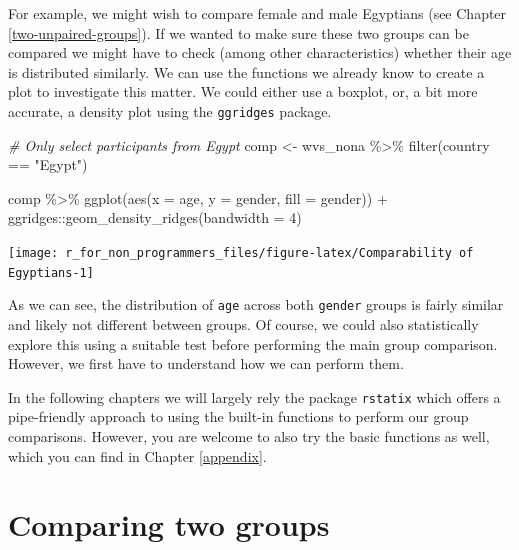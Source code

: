 \documentclass[
]{book}
\newenvironment{Shaded}{\begin{snugshade}}{\end{snugshade}}
\newcommand{\AttributeTok}[1]{\textcolor[rgb]{0.77,0.63,0.00}{#1}}
\newcommand{\CommentTok}[1]{\textcolor[rgb]{0.56,0.35,0.01}{\textit{#1}}}
\newcommand{\DecValTok}[1]{\textcolor[rgb]{0.00,0.00,0.81}{#1}}
\newcommand{\FunctionTok}[1]{\textcolor[rgb]{0.00,0.00,0.00}{#1}}
\newcommand{\NormalTok}[1]{#1}
\newcommand{\OtherTok}[1]{\textcolor[rgb]{0.56,0.35,0.01}{#1}}
\newcommand{\SpecialCharTok}[1]{\textcolor[rgb]{0.00,0.00,0.00}{#1}}
\newcommand{\StringTok}[1]{\textcolor[rgb]{0.31,0.60,0.02}{#1}}
\begin{document}
For example, we might wish to compare female and male Egyptians (see Chapter \ref{two-unpaired-groups}). If we wanted to make sure these two groups can be compared we might have to check (among other characteristics) whether their age is distributed similarly. We can use the functions we already know to create a plot to investigate this matter. We could either use a boxplot, or, a bit more accurate, a density plot using the \texttt{ggridges} package.

\begin{Shaded}
\begin{Highlighting}[]
\CommentTok{\# Only select participants from \textquotesingle{}Egypt\textquotesingle{}}
\NormalTok{comp }\OtherTok{\textless{}{-}}\NormalTok{ wvs\_nona }\SpecialCharTok{\%\textgreater{}\%}
  \FunctionTok{filter}\NormalTok{(country }\SpecialCharTok{==} \StringTok{"Egypt"}\NormalTok{)}

\NormalTok{comp }\SpecialCharTok{\%\textgreater{}\%}
  \FunctionTok{ggplot}\NormalTok{(}\FunctionTok{aes}\NormalTok{(}\AttributeTok{x =}\NormalTok{ age,}
             \AttributeTok{y =}\NormalTok{ gender,}
             \AttributeTok{fill =}\NormalTok{ gender)) }\SpecialCharTok{+}
\NormalTok{  ggridges}\SpecialCharTok{::}\FunctionTok{geom\_density\_ridges}\NormalTok{(}\AttributeTok{bandwidth =} \DecValTok{4}\NormalTok{)}
\end{Highlighting}
\end{Shaded}

\begin{center}\texttt{[image: r\_for\_non\_programmers\_files/figure-latex/Comparability of Egyptians-1]} \end{center}

As we can see, the distribution of \texttt{age} across both \texttt{gender} groups is fairly similar and likely not different between groups. Of course, we could also statistically explore this using a suitable test before performing the main group comparison. However, we first have to understand how we can perform them.

In the following chapters we will largely rely the package \texttt{rstatix} which offers a pipe-friendly approach to using the built-in functions to perform our group comparisons. However, you are welcome to also try the basic functions as well, which you can find in Chapter \ref{appendix}.

\hypertarget{comparing-two-groups}{%
\section{Comparing two groups}\label{comparing-two-groups}}
\end{document}

